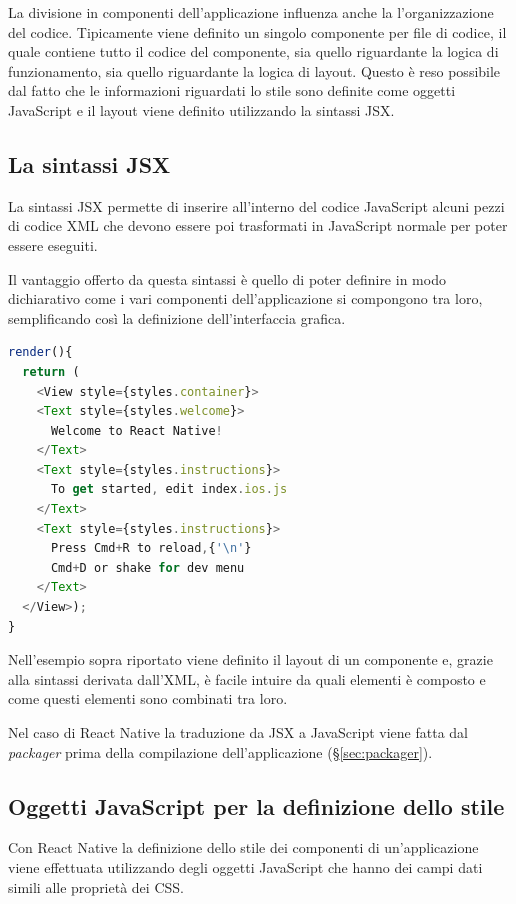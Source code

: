 La divisione in componenti dell'applicazione influenza anche la l'organizzazione del codice. Tipicamente viene definito un singolo componente per file di codice, il quale contiene tutto il codice del componente, sia quello riguardante la logica di funzionamento, sia quello riguardante la logica di layout.
Questo è reso possibile dal fatto che le informazioni riguardati lo stile sono definite come oggetti JavaScript e il layout viene definito utilizzando la sintassi JSX.

\subsection{La sintassi JSX}

La sintassi JSX permette di inserire all'interno del codice JavaScript alcuni pezzi di codice XML che devono essere poi trasformati in JavaScript normale per poter essere eseguiti.

Il vantaggio offerto da questa sintassi è quello di poter definire in modo dichiarativo come i vari componenti dell'applicazione si compongono tra loro, semplificando così la definizione dell'interfaccia grafica.

\begin{lstlisting}[language=JavaScript, caption=Esempio della sintassi JSX di React Native]
render(){
  return (
    <View style={styles.container}>
    <Text style={styles.welcome}>
      Welcome to React Native!
    </Text>
    <Text style={styles.instructions}>
      To get started, edit index.ios.js
    </Text>
    <Text style={styles.instructions}>
      Press Cmd+R to reload,{'\n'}
      Cmd+D or shake for dev menu
    </Text>
  </View>);
}
\end{lstlisting}

Nell'esempio sopra riportato viene definito il layout di un componente e, grazie alla sintassi derivata dall'XML, è facile intuire da quali elementi è composto e come questi elementi sono combinati tra loro.     

Nel caso di React Native la traduzione da JSX a JavaScript viene fatta dal \textit{packager} prima della compilazione dell'applicazione (§\ref{sec:packager}).

\subsection{Oggetti JavaScript per la definizione dello stile}

Con React Native la definizione dello stile dei componenti di un'applicazione viene effettuata utilizzando degli oggetti JavaScript che hanno dei campi dati simili alle proprietà dei CSS.

